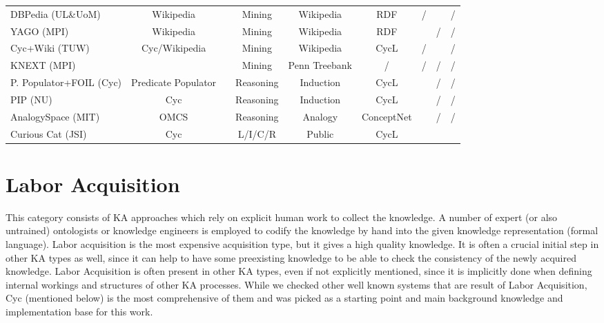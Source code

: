 \begin{landscape}
\begin{table}[htb]
\begin{adjustbox}{width=1.4\textwidth}
\begin{tabular}{lclcccccc}
		DBPedia (UL\&UoM) & Wikipedia & \parencite{Lehmann2015} & Mining & Wikipedia &  RDF & / &\checkmark & / \\
		YAGO (MPI) & Wikipedia & \parencite{Rebele2016} & Mining & Wikipedia &  RDF & \checkmark & / & / \\
		Cyc+Wiki (TUW) & Cyc/Wikipedia & \parencite{Medelyan2008} & Mining & Wikipedia &  CycL & / &\checkmark & / \\
		KNEXT (MPI) & \ & \parencite{Schubert2002} & Mining & Penn Treebank &  / & / & / & / \\
	    P. Populator+FOIL (Cyc) & Predicate Populator & \parencite{Witbrock2005} & Reasoning & Induction &  CycL & \checkmark & / & / \\
	    PIP (NU) & Cyc & \parencite{Sharma2010} & Reasoning & Induction &  CycL & \checkmark & / & / \\
	    AnalogySpace (MIT) & OMCS & \parencite{Speer2008} & Reasoning & Analogy &  ConceptNet & \checkmark & / & / \\
		\hline	
		Curious Cat (JSI) & Cyc & \parencite{Bradesko2017} & L/I/C/R & Public &  CycL & \checkmark & \checkmark & \checkmark \\
	\end{tabular}	
	\end{adjustbox}
\end{table}
\end{landscape}

\section{Labor Acquisition}
\label{section:labouracquisition}
This category consists of KA approaches which rely on explicit human work to 
collect the knowledge. A number of expert (or also untrained) ontologists or 
knowledge engineers is employed to codify the knowledge by hand into the given 
knowledge representation (formal language). Labor acquisition is the most 
expensive acquisition type, but it gives a high quality knowledge. It is often a
crucial initial step in other KA types as well, since it can help to have some 
preexisting knowledge to be able to check the consistency of the newly acquired
knowledge. Labor Acquisition is often present in other KA types, even if not 
explicitly mentioned, since it is implicitly done when defining internal 
workings and structures of other KA processes. While we checked other well 
known systems that are result of Labor Acquisition, Cyc (mentioned below) is 
the most comprehensive of them and was picked as a starting point and main 
background knowledge and implementation base for this work.

